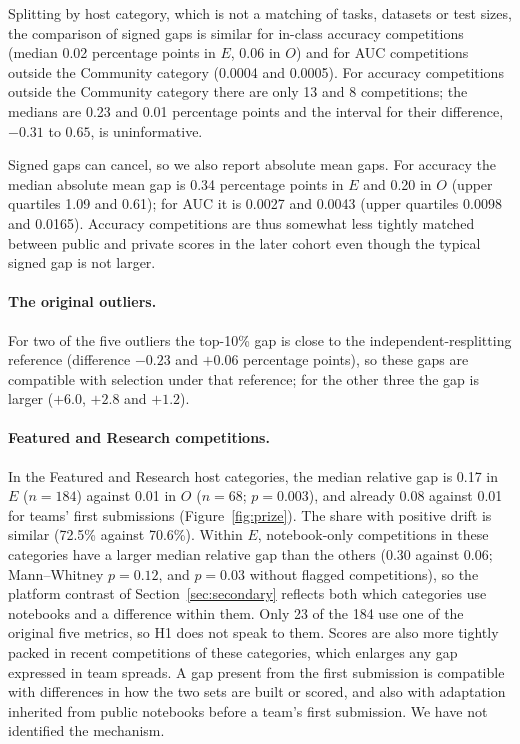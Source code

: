 \documentclass[10pt]{article}
\begin{document}
Splitting by host category, which is not a matching of tasks, datasets or test sizes, the comparison of signed gaps is similar for in-class accuracy competitions (median 0.02 percentage points in $E$, 0.06 in $O$) and for AUC competitions outside the Community category (0.0004 and 0.0005). For accuracy competitions outside the Community category there are only 13 and 8 competitions; the medians are 0.23 and 0.01 percentage points and the interval for their difference, $-0.31$ to $0.65$, is uninformative.

Signed gaps can cancel, so we also report absolute mean gaps. For accuracy the median absolute mean gap is 0.34 percentage points in $E$ and 0.20 in $O$ (upper quartiles 1.09 and 0.61); for AUC it is 0.0027 and 0.0043 (upper quartiles 0.0098 and 0.0165). Accuracy competitions are thus somewhat less tightly matched between public and private scores in the later cohort even though the typical signed gap is not larger.

\paragraph{The original outliers.} For two of the five outliers the top-10\% gap is close to the independent-resplitting reference (difference $-0.23$ and $+0.06$ percentage points), so these gaps are compatible with selection under that reference; for the other three the gap is larger ($+6.0$, $+2.8$ and $+1.2$).

\paragraph{Featured and Research competitions.} In the Featured and Research host categories, the median relative gap is 0.17 in $E$ ($n=184$) against 0.01 in $O$ ($n=68$; $p=0.003$), and already 0.08 against 0.01 for teams' first submissions (Figure~\ref{fig:prize}). The share with positive drift is similar (72.5\% against 70.6\%). Within $E$, notebook-only competitions in these categories have a larger median relative gap than the others (0.30 against 0.06; Mann--Whitney $p=0.12$, and $p=0.03$ without flagged competitions), so the platform contrast of Section~\ref{sec:secondary} reflects both which categories use notebooks and a difference within them. Only 23 of the 184 use one of the original five metrics, so H1 does not speak to them. Scores are also more tightly packed in recent competitions of these categories, which enlarges any gap expressed in team spreads. A gap present from the first submission is compatible with differences in how the two sets are built or scored, and also with adaptation inherited from public notebooks before a team's first submission. We have not identified the mechanism.
\end{document}
